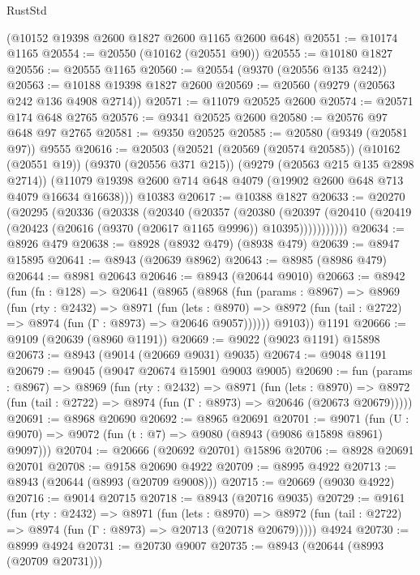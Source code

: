 \begin{lexlean}{RustStd}
\begin{coremodule}
    (@10152 @19398 @2600 @1827 @2600 @1165 @2600 @648)
@20551 := @10174 @1165
@20554 := @20550 (@10162 (@20551 @90))
@20555 := @10180 @1827
@20556 := @20555 @1165
@20560 := @20554 (@9370 (@20556 @135 @242))
@20563 := @10188 @19398 @1827 @2600
@20569 := @20560 (@9279 (@20563 @242 @136 @4908 @2714))
@20571 := @11079 @20525 @2600
@20574 := @20571 @174 @648 @2765
@20576 := @9341 @20525 @2600
@20580 := @20576 @97 @648 @97 @2765
@20581 := @9350 @20525
@20585 := @20580 (@9349 (@20581 @97)) @9555
@20616 := @20503
    (@20521
      (@20569 (@20574 @20585))
      (@10162 (@20551 @19))
      (@9370 (@20556 @371 @215))
      (@9279 (@20563 @215 @135 @2898 @2714))
      (@11079 @19398 @2600 @714 @648 @4079 (@19902 @2600 @648 @713 @4079 @16634 @16638)))
    @10383
@20617 := @10388 @1827
@20633 := @20270
    (@20295
      (@20336
        (@20338
          (@20340
            (@20357
              (@20380
                (@20397
                  (@20410 (@20419 (@20423 (@20616 (@9370 (@20617 @1165 @9996)) @10395)))))))))))
@20634 := @8926 @479
@20638 := @8928 (@8932 @479) (@8938 @479)
@20639 := @8947 @15895
@20641 := @8943 (@20639 @8962)
@20643 := @8985 (@8986 @479)
@20644 := @8981 @20643
@20646 := @8943 (@20644 @9010)
@20663 := @8942
    (fun (fn : @128) =>
    @20641
      (@8965
        (@8968
          (fun (params : @8967) =>
          @8969
            (fun (rty : @2432) =>
            @8971
              (fun (lets : @8970) =>
              @8972 (fun (tail : @2722) => @8974 (fun (Γ : @8973) => @20646 @9057))))))
        @9103))
    @1191
@20666 := @9109 (@20639 (@8960 @1191))
@20669 := @9022 (@9023 @1191) @15898
@20673 := @8943 (@9014 (@20669 @9031) @9035)
@20674 := @9048 @1191
@20679 := @9045 (@9047 @20674 @15901 @9003 @9005)
@20690 := fun (params : @8967) =>
  @8969
    (fun (rty : @2432) =>
    @8971
      (fun (lets : @8970) =>
      @8972 (fun (tail : @2722) => @8974 (fun (Γ : @8973) => @20646 (@20673 @20679)))))
@20691 := @8968 @20690
@20692 := @8965 @20691
@20701 := @9071
    (fun (U : @9070) => @9072 (fun (t : @7) => @9080 (@8943 (@9086 @15898 @8961) @9097)))
@20704 := @20666 (@20692 @20701) @15896
@20706 := @8928 @20691 @20701
@20708 := @9158 @20690 @4922
@20709 := @8995 @4922
@20713 := @8943 (@20644 (@8993 (@20709 @9008)))
@20715 := @20669 (@9030 @4922)
@20716 := @9014 @20715
@20718 := @8943 (@20716 @9035)
@20729 := @9161
    (fun (rty : @2432) =>
    @8971
      (fun (lets : @8970) =>
      @8972 (fun (tail : @2722) => @8974 (fun (Γ : @8973) => @20713 (@20718 @20679)))))
    @4924
@20730 := @8999 @4924
@20731 := @20730 @9007
@20735 := @8943 (@20644 (@8993 (@20709 @20731)))

\end{coremodule}
\end{lexlean}
